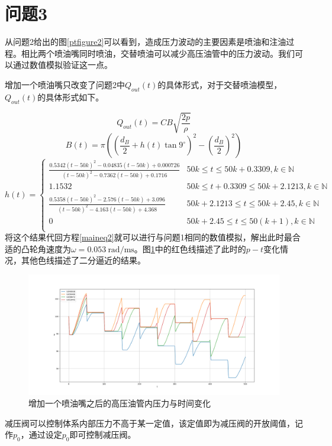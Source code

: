 \documentclass[12pt,AutoFakeBold]{article}%
\begin{document}
    \section{问题3}
    从问题2给出的图\ref{ptfigure2}可以看到，造成压力波动的主要因素是喷油和注油过程。相比两个喷油嘴同时喷油，交替喷油可以减少高压油管中的压力波动。我们可以通过数值模拟验证这一点。\par
    增加一个喷油嘴只改变了问题2中$Q_{out}(t)$的具体形式，对于交替喷油模型，$Q_{out}(t)$的具体形式如下。\par
    \begin{equation}
        Q_{out}(t)=CB\sqrt{\frac{2p}{\rho}}
    \end{equation}
    \begin{equation}
        B(t)=\pi\left(\left(\frac{d_B}{2}+h(t)\tan9^\circ\right)^2-\left(\frac{d_B}{2}\right)^2\right)
    \end{equation}
    \begin{equation}
        h(t)=
        \begin{cases}
            \frac{0.5342(t-50k)^2-0.04835(t-50k)+0.000726}{(t-50k)^2-0.7362(t-50k)+0.1716}&50k\leq t\leq 50k+0.3309,k\in\mathbb{N}\\
            1.1532&50k\leq t+0.3309\leq 50k+2.1213,k\in\mathbb{N}\\
            \frac{0.5358(t-50k)^2-2.576(t-50k)+3.096}{(t-50k)^2-4.163(t-50k)+4.368}&50k+2.1213\leq t\leq 50k+2.45,k\in\mathbb{N}\\
            0&50k+2.45\leq t\leq 50(k+1),k\in\mathbb{N}\\      
        \end{cases}
    \end{equation}
    将这个结果代回方程\ref{maineq2}就可以进行与问题1相同的数值模拟，解出此时最合适的凸轮角速度为$\omega=\SI{0.053}{\radian\per\ms}$。图\ref{ptfigure31}中的红色线描述了此时的$p-t$变化情况，其他色线描述了二分逼近的结果。\par
    \begin{figure}[H]
        \centering
        \includegraphics[scale=0.32]{figure/3-3.png}
        \caption{增加一个喷油嘴之后的高压油管内压力与时间变化}
        \label{ptfigure31}
    \end{figure}
    减压阀可以控制体系内部压力不高于某一定值，该定值即为减压阀的开放阈值，记作$p_0$，通过设定$p_0$即可控制减压阀。
\end{document}
